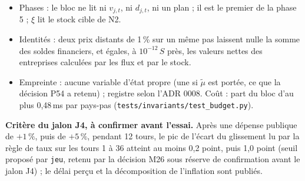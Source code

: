 \documentclass[11pt,a4paper]{article}
\begin{document}
\begin{itemize}
\item Phases : le bloc ne lit ni $v_{j,t}$, ni $d_{j,t}$, ni un plan ; il est le premier de la phase 5 ; $\xi$ lit le stock cible de N2.
\item Identités : deux prix distants de 1\,\% sur un même pas laissent nulle la somme des soldes financiers, et égales, à $10^{-12}\,S$ près, les valeurs nettes des entreprises calculées par les flux et par le stock.
\item Empreinte : aucune variable d'état propre (une si $\tilde\mu$ est portée, ce que la décision P54 a retenu) ; registre selon l'ADR 0008. Coût : part du bloc d'au plus 0,48\,ms par pays-pas (\nolinkurl{tests/invariants/test_budget.py}).
\end{itemize}

\textbf{Critère du jalon J4, à confirmer avant l'essai.} Après une dépense publique de $+1\,\%$, puis de $+5\,\%$, pendant 12 tours, le pic de l'écart du glissement lu par la règle de taux sur les tours 1 à 36 atteint au moins 0,2 point, puis 1,0 point (seuil proposé par \texttt{jeu}, retenu par la décision M26 sous réserve de confirmation avant le jalon J4) ; le délai perçu et la décomposition de l'inflation sont publiés.
\end{document}
